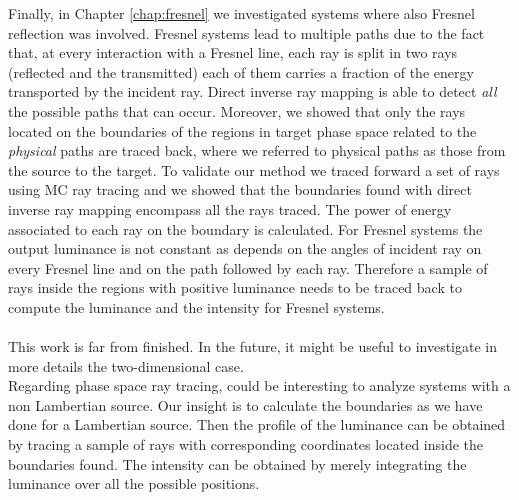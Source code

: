 Finally, in Chapter \ref{chap:fresnel} we investigated systems where also Fresnel reflection was involved. Fresnel systems lead to multiple paths due to the fact that, at every interaction with a Fresnel line, each ray is split in two rays (reflected and the transmitted) each of them carries a fraction of the energy transported by the incident ray. Direct inverse ray mapping is able to detect \textit{all} the possible paths that can occur. Moreover, we showed that only the rays located on the boundaries of the regions in target phase space related to the \textit{physical} paths are traced back, where we referred to physical paths as those from the source to the target. To validate our method we traced forward a set of rays using MC ray tracing and we showed that the boundaries found with direct inverse ray mapping encompass all the rays traced. The power of energy associated to each ray on the boundary is calculated. For Fresnel systems the output luminance is not constant as depends on the angles of incident ray on every Fresnel line and on the path followed by each ray. Therefore a sample of rays inside the regions with positive luminance needs to be traced back to compute the luminance and the intensity for Fresnel systems. \\
\\\indent This work is far from finished. In the future, it might be useful to investigate in more details the two-dimensional case. \\ \indent 
Regarding phase space ray tracing, could be interesting to analyze systems with a non Lambertian source. Our insight is to calculate the boundaries as we have done for a Lambertian source. Then the profile of the luminance can be obtained by tracing a sample of rays with corresponding coordinates located inside the boundaries found. The intensity can be obtained by merely integrating the luminance over all the possible positions. \\ \indent 
